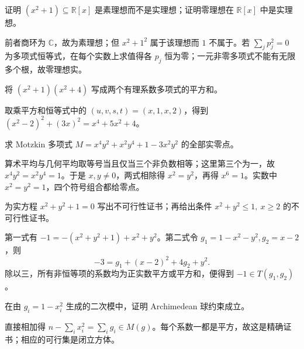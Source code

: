 \begin{exercise}\label{b3:ex:G-real-prime-versus-prime}
	证明 \((x^2+1)\subseteq\mathbb R[x]\) 是素理想而不是实理想；证明零理想在 \(\mathbb R[x]\) 中是实理想。
\end{exercise}
\begin{solution}
	前者商环为 \(\mathbb C\)，故为素理想；但 \(x^2+1^2\) 属于该理想而 \(1\) 不属于。若 \(\sum_jp_j^2=0\) 为多项式恒等式，在每个实数上求值得各 \(p_j\) 恒为零；一元非零多项式不能有无限多个根，故零理想实。
\end{solution}

\begin{exercise}\label{b3:ex:G-univariate-two-squares}
	将 \((x^2+1)(x^2+4)\) 写成两个有理系数多项式的平方和。
\end{exercise}
\begin{solution}
	取乘平方和恒等式中的 \((u,v,s,t)=(x,1,x,2)\)，得到 \((x^2-2)^2+(3x)^2=x^4+5x^2+4\)。
\end{solution}

\begin{exercise}\label{b3:ex:G-motzkin-zeros}
	求 Motzkin 多项式 \(M=x^4y^2+x^2y^4+1-3x^2y^2\) 的全部实零点。
\end{exercise}
\begin{solution}
	算术平均与几何平均取等号当且仅当三个非负数相等；这里第三个为一，故 \(x^4y^2=x^2y^4=1\)。于是 \(x,y\ne0\)，两式相除得 \(x^2=y^2\)，再得 \(x^6=1\)。实数中 \(x^2=y^2=1\)，四个符号组合都给零点。
\end{solution}

\begin{exercise}\label{b3:ex:G-empty-circle-certificate}
	为实方程 \(x^2+y^2+1=0\) 写出不可行性证书；再给出条件 \(x^2+y^2\le1,\ x\ge2\) 的不可行性证书。
\end{exercise}
\begin{solution}
	第一式有 \(-1=-(x^2+y^2+1)+x^2+y^2\)。第二式令 \(g_1=1-x^2-y^2,g_2=x-2\)，则
	\[
		-3=g_1+(x-2)^2+4g_2+y^2.
	\]
	除以三，所有非恒等项的系数均为正实数平方或平方和，便得到 \(-1\in T(g_1,g_2)\)。
\end{solution}

\begin{exercise}\label{b3:ex:G-quadratic-module-ball}
	在由 \(g_i=1-x_i^2\) 生成的二次模中，证明 Archimedean 球约束成立。
\end{exercise}
\begin{solution}
	直接相加得 \(n-\sum_i x_i^2=\sum_i g_i\in M(g)\)。每个系数一都是平方，故这是精确证书；相应的可行集是闭立方体。
\end{solution}

